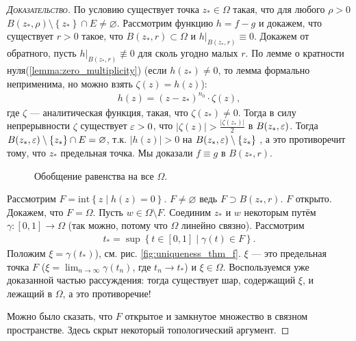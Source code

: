 \documentclass[../complex-analysis.tex]{subfiles}
\begin{document}
\begin{proof}[\normalfont\textsc{Доказательство}]
 По условию существует точка $ z_\ast \in \Omega $ такая, что для любого $ \rho > 0 $ $ B(z_\ast,\rho) \setminus \left\{ z_\ast \right\} \cap E \neq \varnothing $.
 Рассмотрим функцию $ h = f - g $ и докажем, что существует $ r > 0 $ такое, что $ B(z_\ast,r) \subset \Omega $ и $ h|_{B(z_\ast,r)} \equiv 0 $.
 Докажем от обратного, пусть $ h|_{B(z_\ast,r)} \not \equiv 0 $ для сколь угодно малых $ r $. По лемме о кратности нуля(\ref{lemma:zero_multiplicity})
 (если $h(z_\ast) \neq 0$, то лемма формально неприменима, но можно взять $\zeta(z) = h(z)$):
 \begin{align*}
  h(z) = (z - z_\ast)^{n_0} \cdot \zeta(z),
\end{align*} где $ \zeta $ --- аналитическая функция, такая, что $ \zeta(z_\ast) \neq 0 $. 
Тогда в силу непрерывности $ \zeta $ существует $ \varepsilon > 0 $, что $ \left|\zeta(z) \right| > \frac{\left| \zeta(z_\ast) \right|}{2} $ в $ B(z_\ast,\varepsilon) $. Тогда $ B(z_\ast,\varepsilon) \setminus \left\{ z_\ast \right\} \cap E = \varnothing $, т.к. $\left|h(z)\right| > 0$ на $B(z_\ast, \varepsilon) \setminus \{z_\ast\}$  , а это противоречит тому, что $z_\ast$ предельная точка. Мы доказали $ f \equiv g $ в $ B(z_\ast,r) $.

\begin{figure}[ht]
    \centering
    \caption{Обобщение равенства на все $\Omega$. }
    \label{fig:uniqueness_thm_f}
\end{figure}

 Рассмотрим $ F = \mathrm{int} \left\{ z \mid h(z) = 0 \right\} $. $ F \neq \varnothing $ ведь $ F \supset B(z_\ast,r) $. $ F $ открыто. Докажем, что $ F = \Omega $. Пусть $ w \in \Omega \setminus F$. Соединим $ z_\ast $ и $ w $ некоторым путём $ \gamma\colon[0,1] \to \Omega $ (так можно, потому что $ \Omega $ линейно связно). Рассмотрим
 \begin{align*}
  t_\ast = \sup \left\{ t \in [0,1] \mid \gamma(t) \in F \right\}.
\end{align*}  Положим $ \xi = \gamma(t_\ast) $), см. рис. \eqref{fig:uniqueness_thm_f}. $ \xi $ --- это предельная точка $ F $ ($ \xi = \lim_{n \to \infty} \gamma(t_n) $, где $ t_n \to t_\ast $)  и $ \xi \in \Omega $. Воспользуемся уже доказанной частью рассуждения: тогда существует шар, содержащий $ \xi $, и лежащий в $ \Omega $, а это противоречие!

 Можно было сказать, что $ F $ открытое и замкнутое множество в связном пространстве. Здесь скрыт некоторый топологический аргумент.
\end{proof}
\end{document}

